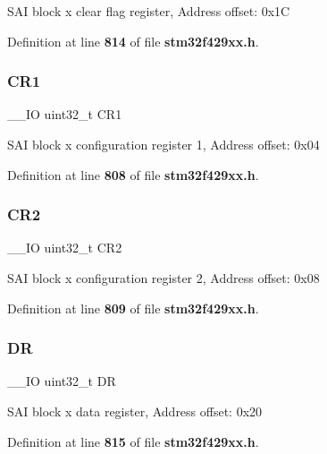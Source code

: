S\+AI block x clear flag register, Address offset\+: 0x1C 

Definition at line \textbf{ 814} of file \textbf{ stm32f429xx.\+h}.

\mbox{\label{structSAI__Block__TypeDef_ab0ec7102960640751d44e92ddac994f0}} 
\subsubsection{C\+R1}
{\footnotesize\ttfamily \+\_\+\+\_\+\+IO uint32\+\_\+t C\+R1}

S\+AI block x configuration register 1, Address offset\+: 0x04 

Definition at line \textbf{ 808} of file \textbf{ stm32f429xx.\+h}.

\mbox{\label{structSAI__Block__TypeDef_afdfa307571967afb1d97943e982b6586}} 
\subsubsection{C\+R2}
{\footnotesize\ttfamily \+\_\+\+\_\+\+IO uint32\+\_\+t C\+R2}

S\+AI block x configuration register 2, Address offset\+: 0x08 

Definition at line \textbf{ 809} of file \textbf{ stm32f429xx.\+h}.

\mbox{\label{structSAI__Block__TypeDef_a3df0d8dfcd1ec958659ffe21eb64fa94}} 
\subsubsection{DR}
{\footnotesize\ttfamily \+\_\+\+\_\+\+IO uint32\+\_\+t DR}

S\+AI block x data register, Address offset\+: 0x20 

Definition at line \textbf{ 815} of file \textbf{ stm32f429xx.\+h}.

\mbox{\label{structSAI__Block__TypeDef_ae307d5a553582e6c9717f50037245710}} 
